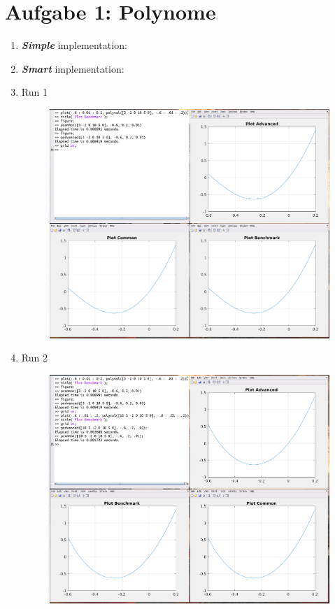 \documentclass[12pt,a4paper]{article}
\begin{document}
\section*{Aufgabe 1: Polynome}
\begin{enumerate}[leftmargin=!,labelindent=5pt]
	\item \textit{\textbf{Simple}} implementation:
		
		\newpage

	\item \textit{\textbf{Smart}} implementation:
		
		\newpage

	\item Run 1
		\begin{figure}[H]
			\centering
			\includegraphics[scale=0.45]{./img/poly_comp_01.png}
		\end{figure}

	\item Run 2
		\begin{figure}[H]
			\centering
			\includegraphics[scale=0.45]{./img/poly_comp_02.png}
		\end{figure}
		\newpage


\end{enumerate}
\end{document}
